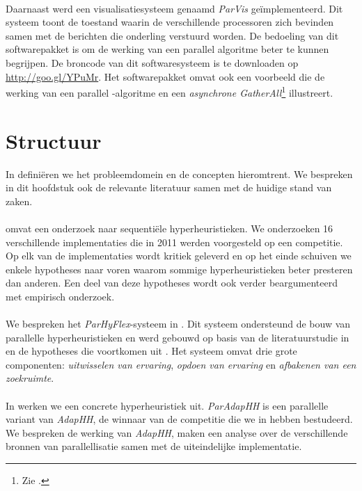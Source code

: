 \paragraph{}
Daarnaast werd een visualisatiesysteem genaamd \emph{ParVis} ge\"implementeerd. Dit systeem toont de toestand waarin de verschillende processoren zich bevinden samen met de berichten die onderling verstuurd worden. De bedoeling van dit softwarepakket is om de werking van een parallel algoritme beter te kunnen begrijpen. De broncode van dit softwaresysteem is te downloaden op \url{http://goo.gl/YPuMr}. Het softwarepakket omvat ook een voorbeeld die de werking van een parallel -algoritme en een \emph{asynchrone GatherAll}\footnote{Zie .} illustreert.


\section{Structuur}
In  defini\"eren we het probleemdomein en de concepten hieromtrent. We bespreken in dit hoofdstuk ook de relevante literatuur samen met de huidige stand van zaken.

\paragraph{}
 omvat een onderzoek naar sequenti\"ele hyperheuristieken. We onderzoeken 16 verschillende implementaties die in 2011 werden voorgesteld op een competitie. Op elk van de implementaties wordt kritiek geleverd en op het einde schuiven we enkele hypotheses naar voren waarom sommige hyperheuristieken beter presteren dan anderen. Een deel van deze hypotheses wordt ook verder beargumenteerd met empirisch onderzoek.

\paragraph{}
We bespreken het \emph{ParHyFlex}-systeem in . Dit systeem ondersteund de bouw van parallelle hyperheuristieken en werd gebouwd op basis van de literatuurstudie in  en de hypotheses die voortkomen uit . Het systeem omvat drie grote componenten: \emph{uitwisselen van ervaring}, \emph{opdoen van ervaring} en \emph{afbakenen van een zoekruimte}.

\paragraph{}
In  werken we een concrete hyperheuristiek uit. \emph{ParAdapHH} is een parallelle variant van \emph{AdapHH}, de winnaar van de competitie die we in  hebben bestudeerd. We bespreken de werking van \emph{AdapHH}, maken een analyse over de verschillende bronnen van parallellisatie samen met de uiteindelijke implementatie.

